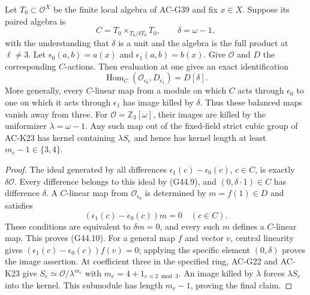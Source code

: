 \begin{proposition}
\label{AC-G44-center}
Let $T_0\subset\mathcal O^X$ be the finite local algebra
of AC-G39 and fix $x\in X$.  Suppose its paired algebra is
\[
 C=T_0\times_{T_0/\delta T_0}T_0,
 \qquad \delta=\omega-1,                               \tag{G44.9}
\]
with the understanding that $\delta$ is a unit and the algebra
is the full product at $\ell\ne3$.
Let $\epsilon_0(a,b)=a(x)$ and $\epsilon_1(a,b)=b(x)$.
Give $\mathcal O$ and $D$ the corresponding $C$-actions.
Then evaluation at one gives an exact identification
\[
 \operatorname{Hom}_{C}(\mathcal O_{\epsilon_0},D_{\epsilon_1})
                     =D[\delta].                      \tag{G44.10}
\]
More generally, every $C$-linear map from a module on which
$C$ acts through $\epsilon_0$ to one on which it acts through
$\epsilon_1$ has image killed by $\delta$.
Thus these balanced maps vanish away from three.
For $\mathcal O=\mathbb Z_3[\omega]$, their images are killed
by the uniformizer $\lambda=\omega-1$.
Any such map out of the fixed-field strict cubic group of
AC-K23 has kernel containing $\lambda S_e$ and hence has
kernel length at least $m_e-1\in\{3,4\}$.
\end{proposition}
\begin{proof}
The ideal generated by all differences
$\epsilon_1(c)-\epsilon_0(c)$, $c\in C$, is exactly
$\delta\mathcal O$.  Every difference belongs to this ideal
by (G44.9), and $(0,\delta\cdot1)\in C$ has difference
$\delta$.  A $C$-linear map from $\mathcal O_{\epsilon_0}$
is determined by $m=f(1)\in D$ and satisfies
\[
       (\epsilon_1(c)-\epsilon_0(c))m=0\quad(c\in C).
\]
These conditions are equivalent to $\delta m=0$, and every
such $m$ defines a $C$-linear map.  This proves (G44.10).
For a general map $f$ and vector $v$, central linearity gives
$(\epsilon_1(c)-\epsilon_0(c))f(v)=0$; applying the specific
element $(0,\delta)$ proves the image assertion.
At coefficient three in the specified ring, AC-G22 and
AC-K23 give $S_e\simeq\mathcal O/\lambda^{m_e}$ with
$m_e=4+1_{e\equiv2\bmod3}$.  An image killed by $\lambda$
forces $\lambda S_e$ into the kernel.  This submodule has
length $m_e-1$, proving the final claim.
\end{proof}

